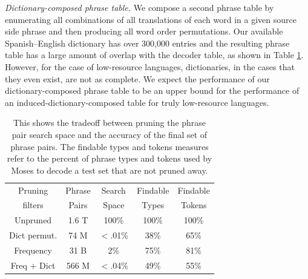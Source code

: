 \documentclass[11pt]{article}
\newcommand{\mnote}[1]{\marginpar{%
  \vskip-\baselineskip
  \raggedright\footnotesize
  \itshape\hrule\smallskip\tiny{#1}\par\smallskip\hrule}}
\newcommand{\mtodo}[1]{\mnote{\textcolor{red}{#1}}}
\newcommand{\todo}[1]{\textcolor{red}{TODO: #1}}
\begin{document}
\noindent\emph{Dictionary-composed phrase table.}\mtodo{Chris had a citation for this method} We compose a second phrase table by enumerating all combinations of all translations of each word in a given source side phrase and then producing all word order permutations. Our available \mtodo{citation from this? it's a combination of some of David's dictionaries, I think} Spanish--English dictionary has over 300,000 entries and the resulting phrase table has a large amount of overlap with the decoder table, as shown in Table \ref{table:prune}. However, for the case of low-resource languages, dictionaries, in the cases that they even exist, are not as complete. We expect the performance of our dictionary-composed phrase table to be an upper bound for the performance of an induced-dictionary-composed table for truly low-resource languages. 


\begin{table}
\small
\begin{center}
\begin{tabular}{|c|c|c|c|c|}
\hline
Pruning 	& Phrase	& Search & 	Findable 	& Findable \\
filters	& Pairs	&  Space & Types 	&  Tokens \\
\hline
Unpruned & 1.6 T & 100\% & 100\% & 100\% \\
Dict permut. & 74 M & $<$.01\% & 38\% & 65\% \\
Frequency &  31 B & 2\% & 75\% & 81\% \\
Freq + Dict & 566 M & $<$.04\% & 49\% & 55\% \\
\hline
\end{tabular}
\caption{This shows the tradeoff between pruning the phrase pair search space and the accuracy of the final set of phrase pairs. The findable types and tokens measures refer to the percent of phrase types and tokens used by Moses to decode a test set that are not pruned away. }\label{table:prune}
\end{center}
\end{table}


\end{document}
